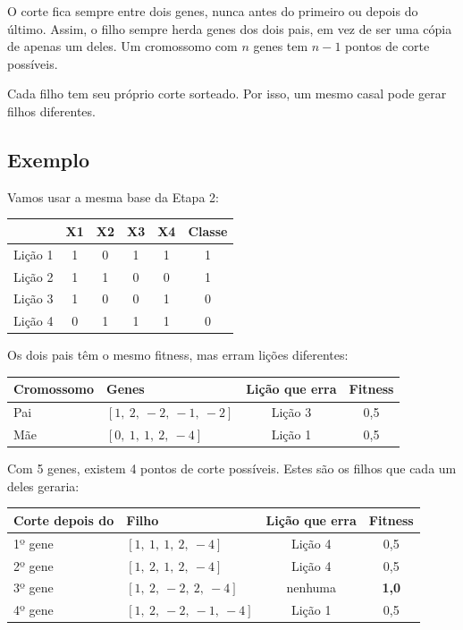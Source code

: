 \documentclass[11pt,a4paper]{article}
\newenvironment{tabela}{\par\nopagebreak[4]\vspace{0.3em}\nopagebreak[4]\begingroup\centering\small}{\par\endgroup\vspace{0.6em}}
\begin{document}
O corte fica sempre entre dois genes, nunca antes do primeiro ou depois do último. Assim, o filho sempre herda genes dos dois pais, em vez de ser uma cópia de apenas um deles. Um cromossomo com $n$ genes tem $n-1$ pontos de corte possíveis.

Cada filho tem seu próprio corte sorteado. Por isso, um mesmo casal pode gerar filhos diferentes.

\subsection{Exemplo}

Vamos usar a mesma base da Etapa 2:

\begin{tabela}
\begin{tabular}{lccccc}
\toprule
 & X1 & X2 & X3 & X4 & Classe\\
\midrule
Lição 1 & 1 & 0 & 1 & 1 & 1\\
Lição 2 & 1 & 1 & 0 & 0 & 1\\
Lição 3 & 1 & 0 & 0 & 1 & 0\\
Lição 4 & 0 & 1 & 1 & 1 & 0\\
\bottomrule
\end{tabular}
\end{tabela}

Os dois pais têm o mesmo fitness, mas erram lições diferentes:

\begin{tabela}
\begin{tabular}{llcc}
\toprule
Cromossomo & Genes & Lição que erra & Fitness\\
\midrule
Pai & $[1,\ 2,\ -2,\ -1,\ -2]$ & Lição 3 & 0,5\\
Mãe & $[0,\ 1,\ 1,\ 2,\ -4]$ & Lição 1 & 0,5\\
\bottomrule
\end{tabular}
\end{tabela}

Com 5 genes, existem 4 pontos de corte possíveis. Estes são os filhos que cada um deles geraria:

\begin{tabela}
\begin{tabular}{llcc}
\toprule
Corte depois do & Filho & Lição que erra & Fitness\\
\midrule
1º gene & $[1,\ 1,\ 1,\ 2,\ -4]$ & Lição 4 & 0,5\\
2º gene & $[1,\ 2,\ 1,\ 2,\ -4]$ & Lição 4 & 0,5\\
3º gene & $[1,\ 2,\ -2,\ 2,\ -4]$ & nenhuma & \textbf{1,0}\\
4º gene & $[1,\ 2,\ -2,\ -1,\ -4]$ & Lição 1 & 0,5\\
\bottomrule
\end{tabular}
\end{tabela}
\end{document}
